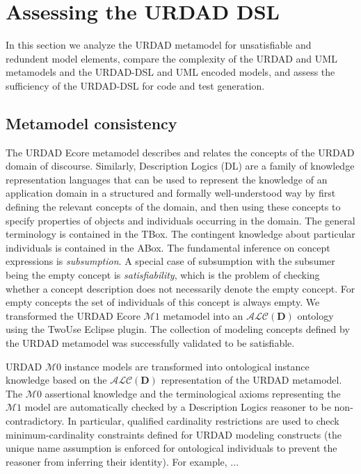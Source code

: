 \section{Assessing the URDAD DSL \label{sec:assessment}}

In this section we analyze the URDAD metamodel for unsatisfiable and redundent model elements, compare the complexity of the URDAD and UML metamodels and the URDAD-DSL and UML encoded models, and assess the sufficiency of the URDAD-DSL for code and test generation.


\subsection{Metamodel consistency}

The URDAD Ecore metamodel describes and relates the concepts of the URDAD domain of discourse. Similarly, Description Logics (DL) are a family of knowledge representation languages that can be used to represent the knowledge of an application domain in a structured and formally well-understood way by first defining the relevant concepts of the domain, and then using these concepts to specify properties of objects and individuals occurring in the domain. The general terminology is contained in the TBox. The contingent knowledge about particular individuals is contained in the ABox. The fundamental inference on concept expressions is \emph{subsumption}. A special case of subsumption with the subsumer being the empty concept is \emph{satisfiability}, which is the problem of checking whether a concept description does not necessarily denote the empty concept. For empty concepts the set of individuals of this concept is always empty. We transformed the URDAD Ecore $\mathcal{M}1$ metamodel into an $\mathcal{ALC}(\textbf{D})$ ontology using the TwoUse \cite{parreiras_using_2010} Eclipse plugin. The collection of modeling concepts defined by the URDAD metamodel was successfully validated to be satisfiable.

URDAD $\mathcal{M}0$ instance models are transformed into ontological instance knowledge based on the $\mathcal{ALC}(\textbf{D})$ representation of the URDAD metamodel. The $\mathcal{M}0$ assertional knowledge and the terminological axioms representing the $\mathcal{M}1$ model are automatically checked by a Description Logics reasoner to be non-contradictory. In particular, qualified cardinality restrictions are used to check minimum-cardinality constraints defined for URDAD modeling constructs (the unique name assumption is enforced for ontological individuals to prevent the reasoner from inferring their identity). For example, ...

